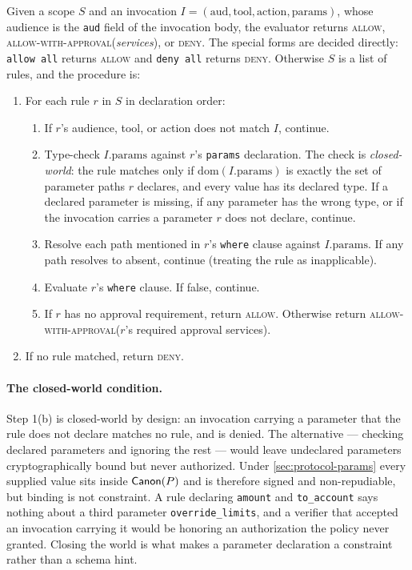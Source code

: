 \documentclass[11pt,a4paper]{article}
\begin{document}
Given a scope $S$ and an invocation
$I = (\text{aud}, \text{tool}, \text{action}, \text{params})$, whose
audience is the \texttt{aud} field of the invocation body, the evaluator returns
\textsc{allow}, \textsc{allow-with-approval}(\textit{services}), or
\textsc{deny}. The special forms are decided directly: \texttt{allow all}
returns \textsc{allow} and \texttt{deny all} returns \textsc{deny}.
Otherwise $S$ is a list of rules, and the procedure is:

\begin{enumerate}
    \item For each rule $r$ in $S$ in declaration order:
    \begin{enumerate}
        \item If $r$'s audience, tool, or action does not match $I$,
              continue.
        \item Type-check $I.\text{params}$ against $r$'s
              \texttt{params} declaration. The check is
              \emph{closed-world}: the rule matches only if
              $\mathrm{dom}(I.\text{params})$ is exactly the set of
              parameter paths $r$ declares, and every value has its
              declared type. If a declared parameter is missing, if any
              parameter has the wrong type, or if the invocation carries
              a parameter $r$ does not declare, continue.
        \item Resolve each path mentioned in $r$'s \texttt{where}
              clause against $I.\text{params}$. If any path resolves
              to absent, continue (treating the rule as inapplicable).
        \item Evaluate $r$'s \texttt{where} clause. If false, continue.
        \item If $r$ has no approval requirement, return \textsc{allow}.
              Otherwise return \textsc{allow-with-approval}($r$'s
              required approval services).
    \end{enumerate}
    \item If no rule matched, return \textsc{deny}.
\end{enumerate}

\paragraph{The closed-world condition.}
Step 1(b) is closed-world by design: an invocation carrying a parameter
that the rule does not declare matches no rule, and is denied. The
alternative --- checking declared parameters and ignoring the rest ---
would leave undeclared parameters cryptographically bound but never
authorized. Under \cref{sec:protocol-params} every supplied value sits
inside $\mathsf{Canon}(P)$ and is therefore signed and non-repudiable, but
binding is not constraint. A rule declaring \texttt{amount} and
\texttt{to\_account} says nothing about a third parameter
\texttt{override\_limits}, and a verifier that accepted an invocation
carrying it would be honoring an authorization the policy never
granted. Closing the world is what makes a parameter declaration a
constraint rather than a schema hint.
\end{document}
